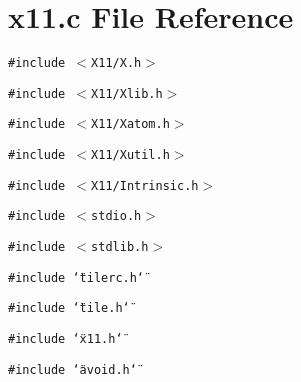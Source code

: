 \section{x11.c File Reference}
\label{x11_8c}
{\tt \#include $<$X11/X.h$>$}\par
{\tt \#include $<$X11/Xlib.h$>$}\par
{\tt \#include $<$X11/Xatom.h$>$}\par
{\tt \#include $<$X11/Xutil.h$>$}\par
{\tt \#include $<$X11/Intrinsic.h$>$}\par
{\tt \#include $<$stdio.h$>$}\par
{\tt \#include $<$stdlib.h$>$}\par
{\tt \#include \char`\"{}tilerc.h\char`\"{}}\par
{\tt \#include \char`\"{}tile.h\char`\"{}}\par
{\tt \#include \char`\"{}x11.h\char`\"{}}\par
{\tt \#include \char`\"{}avoid.h\char`\"{}}\par
